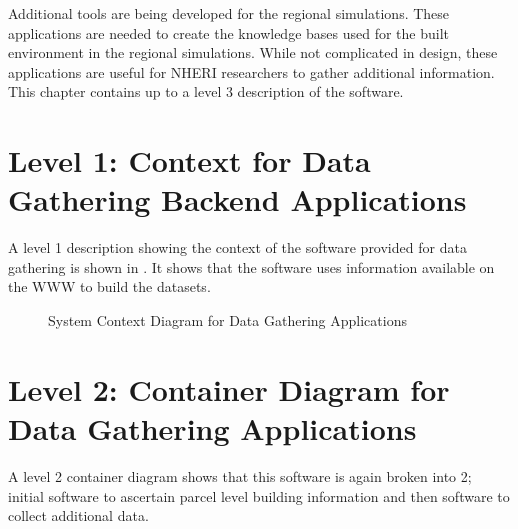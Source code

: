 Additional tools are being developed for the regional simulations. These applications are needed to create the knowledge bases used for the built environment in the regional simulations. While not complicated in design, these applications are useful for NHERI researchers to gather additional information. This chapter contains up to a level 3 description of the software.

\section{Level 1: Context for Data Gathering Backend Applications}

A level 1 description showing the context of the software provided for data gathering is shown in . It shows that the software uses information available on the WWW to build the datasets.

 \begin{figure}[!htbp]
  \caption{System Context Diagram for Data Gathering Applications}
  \label{fig:contextData}
\end{figure}

\section{Level 2: Container Diagram for Data Gathering Applications}
A level 2 container diagram shows that this software is again broken into 2; initial software to ascertain parcel level building information and then software to collect additional data.

